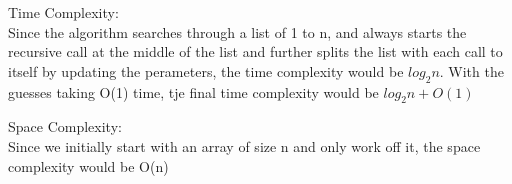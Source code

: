 \documentclass[11pt]{article}
\begin{document}
\begin{text}
Time Complexity: \\
Since the algorithm searches through a list of 1 to n, and always starts the recursive call at the middle of the list and further splits the list with each call to itself by updating the perameters, the time complexity would be $log_2 n$. With the guesses taking O(1) time, tje final time complexity would be $log_2 n + O(1)$\\
\end{text}


\begin{text}
Space Complexity: \\
Since we initially start with an array of size n and only work off it, the space complexity would be O(n)
\end{text}
\end{document}
